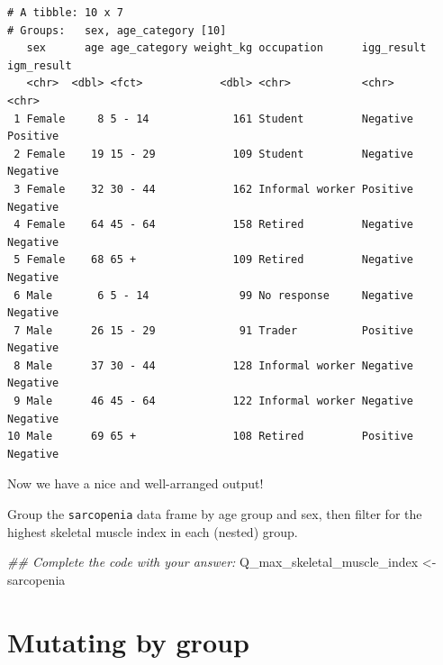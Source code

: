 \documentclass[
  letterpaper,
  DIV=11,
  numbers=noendperiod]{scrreprt}
\newenvironment{Shaded}{\begin{snugshade}}{\end{snugshade}}
\newcommand{\DocumentationTok}[1]{\textcolor[rgb]{0.37,0.37,0.37}{\textit{#1}}}
\newcommand{\NormalTok}[1]{\textcolor[rgb]{0.00,0.23,0.31}{#1}}
\newcommand{\OtherTok}[1]{\textcolor[rgb]{0.00,0.23,0.31}{#1}}
\begin{document}
\begin{verbatim}
# A tibble: 10 x 7
# Groups:   sex, age_category [10]
   sex      age age_category weight_kg occupation      igg_result igm_result
   <chr>  <dbl> <fct>            <dbl> <chr>           <chr>      <chr>     
 1 Female     8 5 - 14             161 Student         Negative   Positive  
 2 Female    19 15 - 29            109 Student         Negative   Negative  
 3 Female    32 30 - 44            162 Informal worker Positive   Negative  
 4 Female    64 45 - 64            158 Retired         Negative   Negative  
 5 Female    68 65 +               109 Retired         Negative   Negative  
 6 Male       6 5 - 14              99 No response     Negative   Negative  
 7 Male      26 15 - 29             91 Trader          Positive   Negative  
 8 Male      37 30 - 44            128 Informal worker Negative   Negative  
 9 Male      46 45 - 64            122 Informal worker Negative   Negative  
10 Male      69 65 +               108 Retired         Positive   Negative  
\end{verbatim}

Now we have a nice and well-arranged output!

\begin{tcolorbox}[enhanced jigsaw, colframe=quarto-callout-tip-color-frame, rightrule=.15mm, opacityback=0, breakable, coltitle=black, colbacktitle=quarto-callout-tip-color!10!white, bottomrule=.15mm, leftrule=.75mm, toprule=.15mm, arc=.35mm, bottomtitle=1mm, colback=white, left=2mm, opacitybacktitle=0.6, titlerule=0mm, title=\textcolor{quarto-callout-tip-color}{\faLightbulb}\hspace{0.5em}{Practice}, toptitle=1mm]

Group the \texttt{sarcopenia} data frame by age group and sex, then
filter for the highest skeletal muscle index in each (nested) group.

\begin{Shaded}
\begin{Highlighting}[]
\DocumentationTok{\#\# Complete the code with your answer:}
\NormalTok{Q\_max\_skeletal\_muscle\_index }\OtherTok{\textless{}{-}} 
\NormalTok{  sarcopenia }
\end{Highlighting}
\end{Shaded}

\end{tcolorbox}

\hypertarget{mutating-by-group}{%
\section{Mutating by group}\label{mutating-by-group}}
\end{document}
